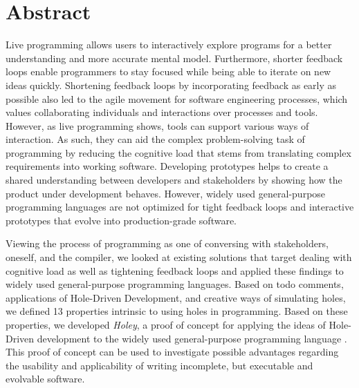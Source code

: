 \chapter{Abstract}
Live programming allows users to interactively explore programs for a better understanding and more accurate mental model.
Furthermore, shorter feedback loops enable programmers to stay focused while being able to iterate on new ideas quickly.
Shortening feedback loops by incorporating feedback as early as possible also led to the agile movement for software engineering processes, which values collaborating individuals and interactions over processes and tools.
However, as live programming shows, tools can support various ways of interaction.
As such, they can aid the complex problem-solving task of programming by reducing the cognitive load that stems from translating complex requirements into working software.
Developing prototypes helps to create a shared understanding between developers and stakeholders by showing how the product under development behaves.
However, widely used general-purpose programming languages are not optimized for tight feedback loops and interactive prototypes that evolve into production-grade software.

Viewing the process of programming as one of conversing with stakeholders, oneself, and the compiler, we looked at existing solutions that target dealing with cognitive load as well as tightening feedback loops and applied these findings to widely used general-purpose programming languages.
Based on todo comments, applications of Hole-Driven Development, and creative ways of simulating holes, we defined 13 properties intrinsic to using holes in programming.
Based on these properties, we developed \emph{Holey}, a proof of concept for applying the ideas of Hole-Driven development to the widely used general-purpose programming language \CS.
This proof of concept can be used to investigate possible advantages regarding the usability and applicability of writing incomplete, but executable and evolvable software.
